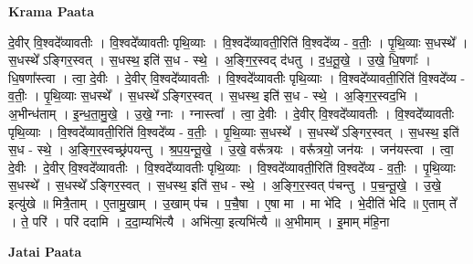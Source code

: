 \documentclass[17pt]{extarticle}
\begin{document}
\textbf{Krama Paata} \newline

दे॒वीर् वि॒श्वदे᳚व्यावतीः । वि॒श्वदे᳚व्यावतीः पृथि॒व्याः । वि॒श्वदे᳚व्यावती॒रिति॑ वि॒श्वदे᳚व्य - व॒तीः॒ । पृ॒थि॒व्याः स॒धस्थे᳚ । स॒धस्थे᳚ ऽङ्गिर॒स्वत् । स॒धस्थ॒ इति॑ स॒ध - स्थे॒ । अ॒ङ्गि॒र॒स्वद् द॑धतु । द॒ध॒तू॒खे॒ । उ॒खे॒ धि॒षणाः᳚ । धि॒षणा᳚स्त्वा । त्वा॒ दे॒वीः । दे॒वीर् वि॒श्वदे᳚व्यावतीः । वि॒श्वदे᳚व्यावतीः पृथि॒व्याः । वि॒श्वदे᳚व्यावती॒रिति॑ वि॒श्वदे᳚व्य - व॒तीः॒ । पृ॒थि॒व्याः स॒धस्थे᳚ । स॒धस्थे᳚ ऽङ्गिर॒स्वत् । स॒धस्थ॒ इति॑ स॒ध - स्थे॒ । अ॒ङ्गि॒र॒स्वद॒भि । अ॒भीन्ध॑ताम् । इ॒न्ध॒ता॒मु॒खे॒ । उ॒खे॒ ग्नाः । ग्नास्त्वा᳚ । त्वा॒ दे॒वीः । दे॒वीर् वि॒श्वदे᳚व्यावतीः । वि॒श्वदे᳚व्यावतीः पृथि॒व्याः । वि॒श्वदे᳚व्यावती॒रिति॑ वि॒श्वदे᳚व्य - व॒तीः॒ । पृ॒थि॒व्याः स॒धस्थे᳚ । स॒धस्थे᳚ ऽङ्गिर॒स्वत् । स॒धस्थ॒ इति॑ स॒ध - स्थे॒ । अ॒ङ्गि॒र॒स्वच्छ्र॑पयन्तु । श्र॒प॒य॒न्तू॒खे॒ । उ॒खे॒ वरू᳚त्रयः । वरू᳚त्रयो॒ जन॑यः । जन॑यस्त्वा । त्वा॒ दे॒वीः । दे॒वीर् वि॒श्वदे᳚व्यावतीः । वि॒श्वदे᳚व्यावतीः पृथि॒व्याः । वि॒श्वदे᳚व्यावती॒रिति॑ वि॒श्वदे᳚व्य - व॒तीः॒ । पृ॒थि॒व्याः स॒धस्थे᳚ । स॒धस्थे᳚ ऽङ्गिर॒स्वत् । स॒धस्थ॒ इति॑ स॒ध - स्थे॒ । अ॒ङ्गि॒र॒स्वत् प॑चन्तु । प॒च॒न्तू॒खे॒ । उ॒खे॒ इत्यु॑खे ॥ मित्रै॒ताम् । ए॒तामु॒खाम् । उ॒खाम् प॑च । प॒चै॒षा । ए॒षा मा । मा भे॑दि । भे॒दीति॑ भेदि ॥ ए॒ताम् ते᳚ । ते॒ परि॑ । परि॑ ददामि । द॒दा॒म्यभि॑त्यै । अभि॑त्या॒ इत्यभि॑त्यै ॥ अ॒भीमाम् । इ॒माम् म॑हि॒ना \newline

\textbf{Jatai Paata} \newline
\end{document}
